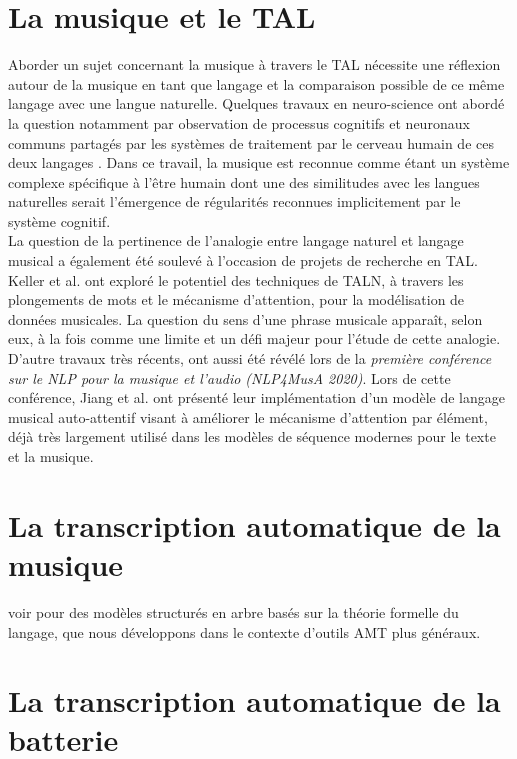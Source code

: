 \section{La musique et le TAL}
Aborder un sujet concernant la musique à travers le TAL nécessite une réflexion autour de la musique en tant que langage et la comparaison possible de ce même langage avec une langue naturelle. Quelques travaux en neuro-science ont abordé la question notamment par observation de processus cognitifs et neuronaux communs partagés par les systèmes de traitement par le cerveau humain de ces deux langages \cite{poulincharronnat:hal-01985213}. Dans ce travail, la musique est reconnue comme étant un système complexe spécifique à l’être humain dont une des similitudes avec les langues naturelles serait l’émergence de régularités reconnues implicitement par le système cognitif.\\
La question de la pertinence de l’analogie entre langage naturel et langage musical a également été soulevé à l’occasion de projets de recherche en TAL. Keller et al. \cite{keller:hal-03279850} ont exploré le potentiel des techniques de TALN, à travers les plongements de mots et le mécanisme d’attention, pour la modélisation de données musicales. La question du sens d’une phrase musicale apparaît, selon eux, à la fois comme une limite et un défi majeur pour l’étude de cette analogie.\\
D’autre travaux très récents, ont aussi été révélé lors de la \textit{première conférence sur le NLP pour la musique et l'audio (NLP4MusA 2020)}. Lors de cette conférence, Jiang et al. \cite{Jiang2020DiscoveringMR} ont présenté leur implémentation d’un modèle de langage musical auto-attentif visant à améliorer le mécanisme d'attention par élément, déjà très largement utilisé dans les modèles de séquence modernes pour le texte et la musique.
\section{La transcription automatique de la musique}
\cite{article1}
\cite{article2}
voir \cite{foscarin:hal-01988990} pour des modèles structurés en arbre basés sur la théorie formelle du langage, que nous développons dans le contexte d'outils AMT plus généraux.
\section{La transcription automatique de la batterie}

